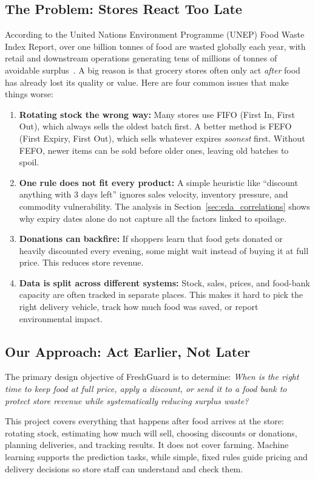 \documentclass[12pt,a4paper]{article}
\renewcommand{\_}{\oldunderscore\allowbreak}
\begin{document}
\subsection{The Problem: Stores React Too Late}
According to the United Nations Environment Programme (UNEP) Food Waste Index Report, over one billion tonnes of food are wasted globally each year, with retail and downstream operations generating tens of millions of tonnes of avoidable surplus~\cite{unep2024}. A big reason is that grocery stores often only act \emph{after} food has already lost its quality or value. Here are four common issues that make things worse:
\begin{enumerate}[leftmargin=18pt, itemsep=2pt]
    \item \textbf{Rotating stock the wrong way:} Many stores use FIFO (First In, First Out), which always sells the oldest batch first. A better method is FEFO (First Expiry, First Out), which sells whatever expires \emph{soonest} first. Without FEFO, newer items can be sold before older ones, leaving old batches to spoil.
    \item \textbf{One rule does not fit every product:} A simple heuristic like ``discount anything with 3 days left'' ignores sales velocity, inventory pressure, and commodity vulnerability. The analysis in Section~\ref{sec:eda_correlations} shows why expiry dates alone do not capture all the factors linked to spoilage.
    \item \textbf{Donations can backfire:} If shoppers learn that food gets donated or heavily discounted every evening, some might wait instead of buying it at full price. This reduces store revenue.
    \item \textbf{Data is split across different systems:} Stock, sales, prices, and food-bank capacity are often tracked in separate places. This makes it hard to pick the right delivery vehicle, track how much food was saved, or report environmental impact.
\end{enumerate}

\subsection{Our Approach: Act Earlier, Not Later}
The primary design objective of FreshGuard is to determine: \emph{When is the right time to keep food at full price, apply a discount, or send it to a food bank to protect store revenue while systematically reducing surplus waste?}

This project covers everything that happens after food arrives at the store: rotating stock, estimating how much will sell, choosing discounts or donations, planning deliveries, and tracking results. It does not cover farming. Machine learning supports the prediction tasks, while simple, fixed rules guide pricing and delivery decisions so store staff can understand and check them.
\end{document}

